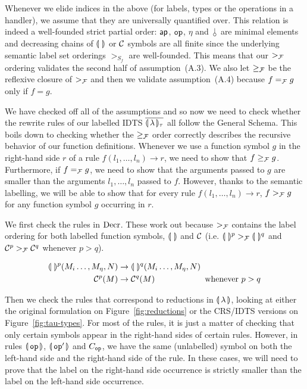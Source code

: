 Whenever we elide indices in the above (for labels, types or the operations
in a handler), we assume that they are universally quantified over. This
relation is indeed a well-founded strict partial order: $\mathsf{ap}$, $\mathtt{op}$,
$\eta$ and $\cherry$ are minimal elements and decreasing chains of
$\llparenthesis \,  \, \rrparenthesis$ or $\mathcal{C}$ symbols are all finite since the underlying semantic
label set orderings $>_{S_f}$ are well-founded. This means that our $>_{\mathcal{F}}$
ordering validates the second half of assumption~(A.3). We also let
$\ge_{\mathcal{F}}$ be the reflexive closure of $>_{\mathcal{F}}$ and then we validate
assumption~(A.4) because $f =_{\mathcal{F}} g$ only if $f = g$.

We have checked off all of the assumptions and so now we need to check
whether the rewrite rules of our labelled IDTS ${\overline{\llparenthesis \, \lambda \, \rrparenthesis_\tau}}$ all follow the
General Schema. This boils down to checking whether the $\ge_{\mathcal{F}}$ order
correctly describes the recursive behavior of our function definitions.
Whenever we use a function symbol $g$ in the right-hand side $r$ of a rule
$f(l_1, \ldots, l_n) \to r$, we need to show that $f \ge_{\mathcal{F}}
g$. Furthermore, if $f =_{\mathcal{F}} g$, we need to show that the arguments passed
to $g$ are smaller than the arguments $l_1, \ldots, l_n$ passed to
$f$. However, thanks to the semantic labelling, we will be able to show
that for every rule $f(l_1, \ldots, l_n) \to r$, $f >_{\mathcal{F}} g$ for any
function symbol $g$ occurring in $r$.

We first check the rules in $\mathrm{Decr}$. These work out because $>_{\mathcal{F}}$
contains the label ordering for both labelled function symbols, $\llparenthesis \,  \, \rrparenthesis$
and $\mathcal{C}$ (i.e. $\llparenthesis \,  \, \rrparenthesis^p >_{\mathcal{F}} \llparenthesis \,  \, \rrparenthesis^q$ and $\mathcal{C}^p >_{\mathcal{F}} \mathcal{C}^q$
whenever $p > q$).

\begin{align*}
  \llparenthesis \,  \, \rrparenthesis^p(M_i \ldots, M_\eta, N) &\to \llparenthesis \,  \, \rrparenthesis^q(M_i \ldots, M_\eta, N) \\
  \mathcal{C}^p(M) &\to \mathcal{C}^q(M) \text{\hspace{2cm} whenever $p > q$}
\end{align*}

Then we check the rules that correspond to reductions in
$\llparenthesis \, \lambda \, \rrparenthesis$, looking at either the original formulation on
Figure~\ref{fig:reductions} or the CRS/IDTS versions on
Figure~\ref{fig:tau-types}. For most of the rules, it is just a matter of
checking that only certain symbols appear in the right-hand sides of
certain rules. However, in rules $\llparenthesis \, \mathtt{op} \, \rrparenthesis$, $\llparenthesis \, \mathtt{op}' \, \rrparenthesis$
and $C_{\mathtt{op}}$, we have the same (unlabelled) symbol on both the
left-hand side and the right-hand side of the rule. In these cases, we will
need to prove that the label on the right-hand side occurrence is strictly
smaller than the label on the left-hand side occurrence.

